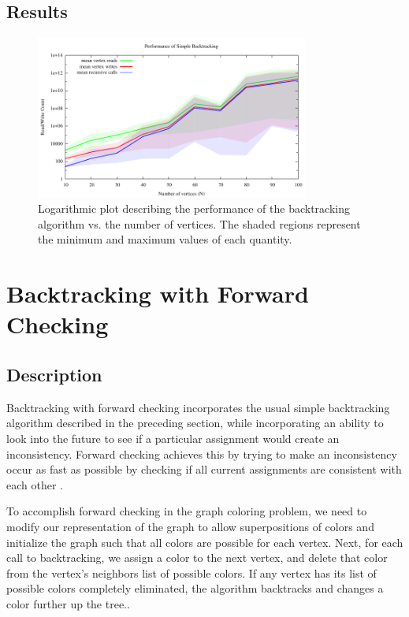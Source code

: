 \documentclass{article}
\begin{document}
	
	\subsection{Results}
	
		
	
		\begin{figure}[h!]
			\centering
			\includegraphics[width=0.8\textwidth]{../results_5/backtracking_simple/bt_simple_performance}
			\caption{Logarithmic plot describing the performance of the backtracking algorithm vs. the number of vertices. The shaded regions represent the minimum and maximum values of each quantity.}
		\end{figure}
	
\section{Backtracking with Forward Checking}

	\subsection{Description}
	
		Backtracking with forward checking incorporates the usual simple backtracking algorithm described in the preceding section, while incorporating an ability to look into the future to see if a particular assignment would create an inconsistency. Forward checking achieves this by trying to make an inconsistency occur as fast as possible by checking if all current assignments are consistent with each other \cite{haralick}.
		
		To accomplish forward checking in the graph coloring problem, we need to modify our representation of the graph to allow superpositions of colors and initialize the graph such that all colors are possible for each vertex. Next, for each call to backtracking, we assign a color to the next vertex, and delete that color from the vertex's neighbors list of possible colors. If any vertex has its list of possible colors completely eliminated, the algorithm backtracks and changes a color further up the tree.\cite{ai}.
		
\end{document}

